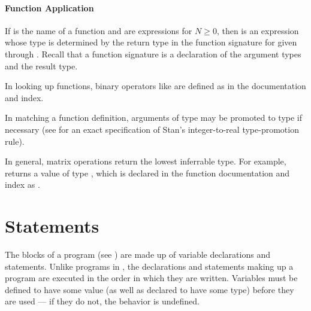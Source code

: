 \subsubsection{Function Application}

If  is the name of a function and  are
expressions for $N \geq 0$, then  is an expression
whose type is determined by the return type in the function signature
for  given  through .  Recall that a
function signature is a declaration of the argument types and the
result type.  

In looking up functions, binary operators like  are
defined as  in the documentation and index.

In matching a function definition, arguments of type  may be
promoted to type  if necessary (see  for an
exact specification of Stan's integer-to-real type-promotion rule).

In general, matrix operations return the lowest inferrable type.  For
example,  returns a value of type
, which is declared in the function documentation and index
as .







\chapter{Statements}

\noindent 
The blocks of a \Stan program (see ) are made up of
variable declarations and statements.  Unlike programs in \BUGS, the
declarations and statements making up a \Stan program are executed in
the order in which they are written.  Variables must be defined to
have some value (as well as declared to have some type) before they
are used --- if they do not, the behavior is undefined.

